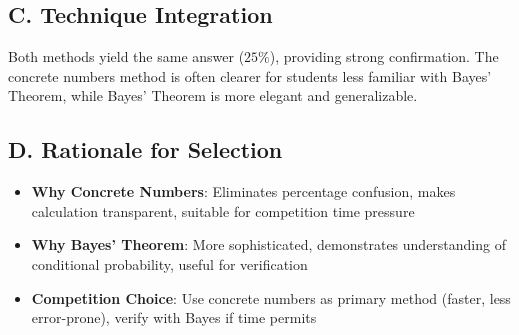 \documentclass[]{article}
\begin{document}
\begin{techniquesbox}
\subsection*{C. Technique Integration}
Both methods yield the same answer ($25\%$), providing strong confirmation. The concrete numbers method is often clearer for students less familiar with Bayes' Theorem, while Bayes' Theorem is more elegant and generalizable.

\subsection*{D. Rationale for Selection}
\begin{itemize}[leftmargin=*]
    \item \textbf{Why Concrete Numbers}: Eliminates percentage confusion, makes calculation transparent, suitable for competition time pressure
    
    \item \textbf{Why Bayes' Theorem}: More sophisticated, demonstrates understanding of conditional probability, useful for verification
    
    \item \textbf{Competition Choice}: Use concrete numbers as primary method (faster, less error-prone), verify with Bayes if time permits
\end{itemize}
\end{techniquesbox}
\end{document}

